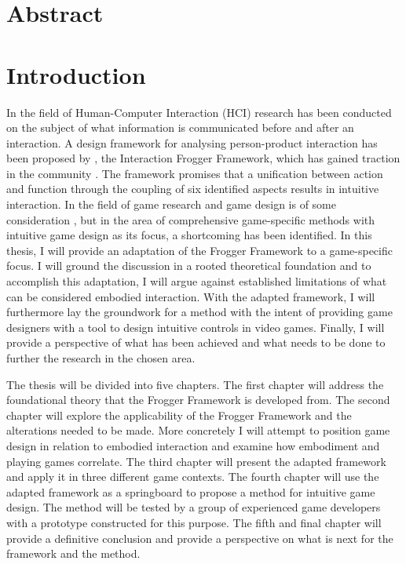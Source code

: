 \section*{Abstract}


\section*{Introduction}
In the field of Human-Computer Interaction (HCI) research has been conducted on the subject of what information is communicated before and after an interaction. A design framework for analysing person-product interaction has been proposed by , the Interaction Frogger Framework, which has gained traction in the community \cite{transbehav, tangifrog, vermeulen, rthroughd, move, easy}. The framework promises that a unification between action and function through the coupling of six identified aspects results in intuitive interaction. In the field of game research and game design is of some consideration \cite{salen, fullerton, schell, adams, agustin}, but in the area of comprehensive game-specific methods with intuitive game design as its focus, a shortcoming has been identified. In this thesis, I will provide an adaptation of the Frogger Framework to a game-specific focus. I will ground the discussion in a rooted theoretical foundation and to accomplish this adaptation, I will argue against established limitations \cite{dourish} of what can be considered embodied interaction. With the adapted framework, I will furthermore lay the groundwork for a method with the intent of providing game designers with a tool to design intuitive controls in video games. Finally, I will provide a perspective of what has been achieved and what needs to be done to further the research in the chosen area.

The thesis will be divided into five chapters. The first chapter will address the foundational theory that the Frogger Framework is developed from. The second chapter will explore the applicability of the Frogger Framework and the alterations needed to be made. More concretely I will attempt to position game design in relation to embodied interaction and examine how embodiment and playing games correlate. The third chapter will present the adapted framework and apply it in three different game contexts. The fourth chapter will use the adapted framework as a springboard to propose a method for intuitive game design. The method will be tested by a group of experienced game developers with a prototype constructed for this purpose. The fifth and final chapter will provide a definitive conclusion and provide a perspective on what is next for the framework and the method.
